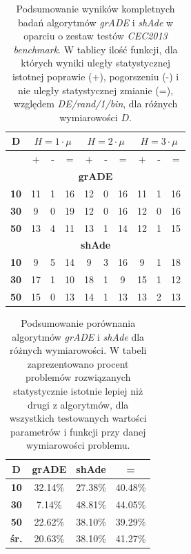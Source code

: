 \documentclass[12pt,a4paper]{report}
\begin{document}
{{{{{{{\begin{table}[h]
\centering
\caption{Podsumowanie wyników kompletnych badań algorytmów \emph{grADE} i \emph{shAde} w oparciu o zestaw testów \emph{CEC2013 benchmark}. W tablicy ilość funkcji, dla których wyniki uległy statystycznej istotnej poprawie (+), pogorszeniu (-) i nie uległy statystycznej zmianie (=), względem \emph{DE/rand/1/bin}, dla różnych wymiarowości $D$.}
\label{shAde_and_grADE}
\begin{tabular}{|c|c|c|c||c|c|c||c|c|c|}
\hline
{\bf D}  & \multicolumn{3}{c||}{{\bf $H = 1 \cdot \mu$}} & \multicolumn{3}{c||}{{\bf $H = 2 \cdot \mu$}} & \multicolumn{3}{c|}{{\bf $H = 3 \cdot \mu$}} \\ \hline
         & +             & -             & =            & +             & -             & =            & +             & -             & =            \\ \hline
\multicolumn{10}{|c|}{{\bf grADE}}                                                                                                                    \\ \hline
{\bf 10} & 11 & 1	& 16	& 12	&0	&16&	11&	1	&16 \\ \hline
{\bf 30} &  9&	0	&19	&12&	0&	16	&12	&0	&16
\\ \hline
{\bf 50} & 13&	4&	11&	13	&1&	14&	12&	1&	15 \\ \hline
\multicolumn{10}{|c|}{{\bf shAde}}                                                                                                                    \\ \hline
{\bf 10} & 9&	5	&14&	9	&3	&16	&9	&1	&18
\\ \hline
{\bf 30} & 17&	1&	10	&18	&1&	9&	15&	1&	12 \\ \hline
{\bf 50} & 15&	0&	13&	14&	1&	13&	13&	2&	13 \\ \hline
\end{tabular}
\end{table}

\begin{table}[h]
\centering
\caption{Podsumowanie porównania algorytmów \emph{grADE} i \emph{shAde} dla różnych wymiarowości. W tabeli zaprezentowano procent problemów rozwiązanych statystycznie istotnie lepiej niż drugi z algorytmów, dla wszystkich testowanych wartości parametrów i funkcji przy danej wymiarowości problemu.}
\label{shAdevsgrADE}
\begin{tabular}{|c|c|c|c|}
\hline
{\bf D}   & {\bf grADE} & {\bf shAde} & {\bf =} \\ \hline
{\bf 10}  & 32.14\%     & 27.38\%     & 40.48\% \\ \hline
{\bf 30}  & 7.14\%      & 48.81\%     & 44.05\% \\ \hline
{\bf 50}  & 22.62\%     & 38.10\%     & 39.29\% \\ \hline
{\bf śr.} & 20.63\%     & 38.10\%     & 41.27\% \\ \hline
\end{tabular}
\end{table}
\newpage
}}}}}}}
\end{document}
